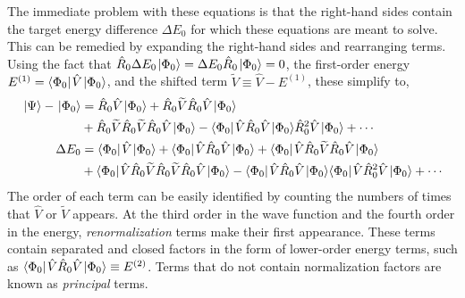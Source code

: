 \documentclass[thesis.tex]{subfiles}
\begin{document}
The immediate problem with these equations is that the right-hand sides contain the target energy difference $\Delta E_{0}$ for which these equations are meant to solve.  This can be remedied by expanding the right-hand sides and rearranging terms.  Using the fact that $\hat{R}_{0}\Delta E_{0}\hspace{1pt}\lvert \Phi_{0} \rangle = \Delta E_{0}\hat{R}_{0}\hspace{1pt}\lvert \Phi_{0} \rangle = 0$, the first-order energy $E^{(1)} = \langle \Phi_{0} |\hspace{1pt}\hat{V}\hspace{1pt}\lvert \Phi_{0} \rangle$, and the shifted term $\widetilde{V} \equiv \hat{V} - E^{(1)}$, these simplify to,
\begin{align}
  \hspace{1pt}\lvert \Psi \rangle - \hspace{1pt}\lvert \Phi_{0} \rangle &= \hat{R}_{0}\hat{V}\hspace{1pt}\lvert \Phi_{0} \rangle + \hat{R}_{0}\widetilde{V}\hat{R}_{0}\hat{V}\hspace{1pt}\lvert \Phi_{0} \rangle \notag \\
  &+ \hat{R}_{0}\widetilde{V}\hat{R}_{0}\widetilde{V}\hat{R}_{0}\hat{V}\hspace{1pt}\lvert \Phi_{0} \rangle - \langle \Phi_{0} |\hspace{1pt}\hat{V}\hat{R}_{0}\hat{V}\hspace{1pt}\lvert \Phi_{0} \rangle\hat{R}^{2}_{0}\hat{V}\hspace{1pt}\lvert \Phi_{0} \rangle + \cdots \\
  \Delta E_{0} &= \langle \Phi_{0} |\hspace{1pt}\hat{V}\hspace{1pt}\lvert \Phi_{0} \rangle + \langle \Phi_{0} |\hspace{1pt}\hat{V}\hat{R}_{0}\hat{V}\hspace{1pt}\lvert \Phi_{0} \rangle + \langle \Phi_{0} |\hspace{1pt}\hat{V}\hat{R}_{0}\widetilde{V}\hat{R}_{0}\hat{V}\hspace{1pt}\lvert \Phi_{0} \rangle \notag \\
  &+ \langle \Phi_{0} |\hspace{1pt}\hat{V}\hat{R}_{0}\widetilde{V}\hat{R}_{0}\widetilde{V}\hat{R}_{0}\hat{V}\hspace{1pt}\lvert \Phi_{0} \rangle - \langle \Phi_{0} |\hspace{1pt}\hat{V}\hat{R}_{0}\hat{V}\hspace{1pt}\lvert \Phi_{0} \rangle\langle \Phi_{0} |\hspace{1pt}\hat{V}\hat{R}^{2}_{0}\hat{V}\hspace{1pt}\lvert \Phi_{0} \rangle + \cdots
\end{align}
The order of each term can be easily identified by counting the numbers of times that $\hat{V}$ or $\widetilde{V}$ appears.  At the third order in the wave function and the fourth order in the energy, \textit{renormalization} terms make their first appearance.  These terms contain separated and closed factors in the form of lower-order energy terms, such as $\langle \Phi_{0} |\hspace{1pt}\hat{V}\hat{R}_{0}\hat{V}\hspace{1pt}\lvert \Phi_{0} \rangle \equiv E^{(2)}$.  Terms that do not contain normalization factors are known as \textit{principal} terms.
\end{document}
